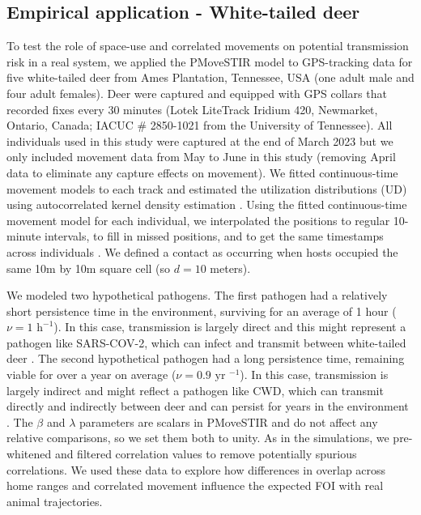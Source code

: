 \documentclass[letterpaper]{article}
\begin{document}
\subsection*{Empirical application - White-tailed deer}

To test the role of space-use and correlated movements on potential transmission risk in a real system, we applied the PMoveSTIR model to GPS-tracking data for five white-tailed deer from Ames Plantation, Tennessee, USA (one adult male and four adult females). 
Deer were captured and equipped with GPS collars that recorded fixes every 30 minutes (Lotek LiteTrack Iridium 420, Newmarket, Ontario, Canada; IACUC \# 2850-1021 from the University of Tennessee).  All individuals used in this study were captured at the end of March 2023 but we only included movement data from May to June in this study (removing April data to eliminate any capture effects on movement).  We fitted continuous-time movement models to each track and estimated the utilization distributions (UD) using autocorrelated kernel density estimation \citep[AKDE, ][]{Calabrese2016}. Using the fitted continuous-time movement model for each individual, we interpolated the positions to regular 10-minute intervals, to fill in missed positions, and to get the same timestamps across individuals \citep{Yang2023}.  We defined a contact as occurring when hosts occupied the same 10m by 10m square cell (so $d = 10$ meters). 

We modeled two hypothetical pathogens. The first pathogen had a relatively short persistence time in the environment, surviving for an average of 1 hour  ($\nu=1\text{ h}^{-1 }$). In this case, transmission is largely direct and this might represent a pathogen like SARS-COV-2, which can infect and transmit between white-tailed deer \citep{Hale2022}. The second hypothetical pathogen had a long persistence time, remaining viable for over a year on average ($\nu=0.9 \text{ yr }^{-1}$). In this case, transmission is largely indirect and might reflect a pathogen like CWD, which can transmit directly and indirectly between deer and can persist for years in the environment \citep{Saunders2012a}. The $\beta$ and $\lambda$ parameters are scalars in PMoveSTIR and do not affect any relative comparisons, so we set them both to unity. As in the simulations, we pre-whitened and filtered correlation values to remove potentially spurious correlations. 
We used these data to explore how differences in overlap across home ranges and correlated movement influence the expected FOI with real animal trajectories.
\end{document}
